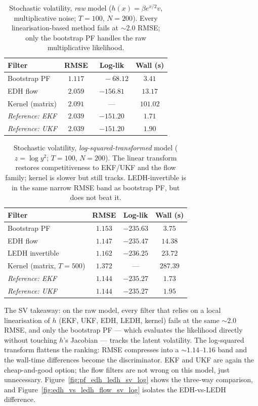 \documentclass{article}
\begin{document}
\begin{table}[H]
\centering
\footnotesize
\caption{Stochastic volatility, \emph{raw} model ($h(x)=\beta e^{x/2}v$, multiplicative noise; $T=100$, $N=200$). Every linearisation-based method fails at ${\sim}2.0$ RMSE; only the bootstrap PF handles the raw multiplicative likelihood.}
\label{tab:edh-sv-raw}
\begin{tabular}{lccc}
\toprule
Filter & RMSE & Log-lik & Wall (s) \\
\midrule
Bootstrap PF            & $1.117$ & $\phantom{+}-68.12$  & $3.41$ \\
EDH flow                & $2.059$ & $-156.81$ & $13.17$ \\
Kernel (matrix)         & $2.091$ & --- & $101.02$ \\
\textit{Reference: EKF} & $2.039$ & $-151.20$ & $1.71$ \\
\textit{Reference: UKF} & $2.039$ & $-151.20$ & $1.90$ \\
\bottomrule
\end{tabular}
\end{table}

\begin{table}[H]
\centering
\footnotesize
\caption{Stochastic volatility, \emph{log-squared-transformed} model ($z = \log y^2$; $T=100$, $N=200$). The linear transform restores competitiveness to EKF/UKF and the flow family; kernel is slower but still tracks. LEDH-invertible is in the same narrow RMSE band as bootstrap PF, but does not beat it.}
\label{tab:edh-sv-log}
\begin{tabular}{lccc}
\toprule
Filter & RMSE & Log-lik & Wall (s) \\
\midrule
Bootstrap PF        & $1.153$ & $-235.63$ & $3.75$ \\
EDH flow            & $1.147$ & $-235.47$ & $14.38$ \\
LEDH invertible     & $1.162$ & $-236.25$ & $23.72$ \\
Kernel (matrix, $T=500$) & $1.372$ & --- & $287.39$ \\
\textit{Reference: EKF} & $1.144$ & $-235.27$ & $1.73$ \\
\textit{Reference: UKF} & $1.144$ & $-235.27$ & $1.95$ \\
\bottomrule
\end{tabular}
\end{table}

The SV takeaway: on the raw model, every filter that relies on a local linearisation of $h$ (EKF, UKF, EDH, LEDH, kernel) fails at the same ${\sim}2.0$ RMSE, and only the bootstrap PF --- which evaluates the likelihood directly without touching $h$'s Jacobian --- tracks the latent volatility. The log-squared transform flattens the ranking: RMSE compresses into a ${\sim}1.14$--$1.16$ band and the wall-time differences become the discriminator. EKF and UKF are again the cheap-and-good option; the flow filters are not wrong on this model, just unnecessary. Figure~\ref{fig:pf_edh_ledh_sv_log} shows the three-way comparison, and Figure~\ref{fig:edh_vs_ledh_flow_sv_log} isolates the EDH-vs-LEDH difference.
\end{document}
